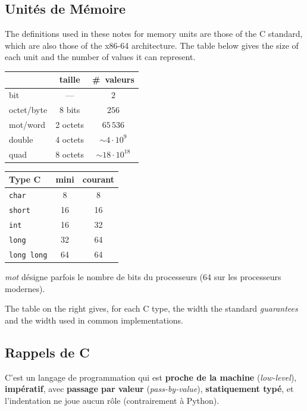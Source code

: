 \subsection{Unités de Mémoire}
The definitions used in these notes for memory units are those of the C
standard, which are also those of the x86-64 architecture. The table below
gives the size of each unit and the number of values it can represent.
\begin{center}
  \begin{tabular}{lcc}
    \toprule
    & taille & \#~valeurs \\
    \midrule
    bit         & ---       & $2$ \\
    octet/byte  & 8 bits    & $256$ \\
    mot/word    & 2 octets  & $65\,536$ \\
    double      & 4 octets  & $\sim 4\cdot 10^{9}$ \\
    quad        & 8 octets  & $\sim 18\cdot 10^{18}$ \\
    \bottomrule
  \end{tabular}
  \hspace{1.2cm}
  \begin{tabular}{lcc}
    \toprule
    Type C & mini & courant \\
    \midrule
    \texttt{char}      & 8  & 8  \\
    \texttt{short}     & 16 & 16 \\
    \texttt{int}       & 16 & 32 \\
    \texttt{long}      & 32 & 64 \\
    \texttt{long long} & 64 & 64 \\
    \bottomrule
  \end{tabular}
\end{center}

\begin{remark}
  \textit{mot} désigne parfois le nombre de bits du processeurs (64 sur les
  processeurs modernes).
\end{remark}

The table on the right gives, for each C type, the width the standard
\emph{guarantees} and the width used in common implementations.

\subsection{Rappels de C}
C'est un langage de programmation qui est \textbf{proche de la machine}
(\textit{low-level}), \textbf{impératif}, avec \textbf{passage par valeur}
(\textit{pass-by-value}), \textbf{statiquement typé}, et l'indentation ne joue
aucun rôle (contrairement à Python).
